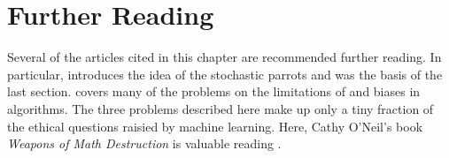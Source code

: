 \section{Further Reading}\label{ch12:sec12.4}

Several of the articles cited in this chapter are recommended further reading. In particular, \textcite{bender2021dangers}  introduces the idea of the stochastic parrots and was the basis of the last section. \textcite{sumpter2018outnumbered} covers many of the problems on the limitations of and biases in algorithms. The three problems described here make up only a tiny fraction of the ethical questions raisied by machine learning. Here, Cathy O'Neil's book \textit{Weapons of Math Destruction} is valuable reading \parencite{o2016weapons}.

\cleardoublepage 